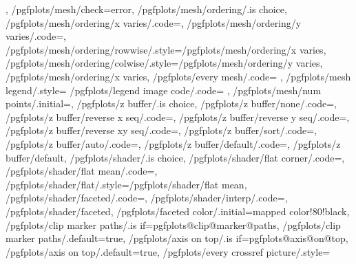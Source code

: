 {{{{{				}%
			}%
		}%
	},%
	/pgfplots/mesh/check=error,
	/pgfplots/mesh/ordering/.is choice,
	/pgfplots/mesh/ordering/x varies/.code={\def\pgfplots@plot@mesh@ordering{0}},
	/pgfplots/mesh/ordering/y varies/.code={\def\pgfplots@plot@mesh@ordering{1}},
	/pgfplots/mesh/ordering/rowwise/.style={/pgfplots/mesh/ordering/x varies},
	/pgfplots/mesh/ordering/colwise/.style={/pgfplots/mesh/ordering/y varies},
	/pgfplots/mesh/ordering/x varies,
	/pgfplots/every mesh/.code={%
	},%
	/pgfplots/mesh legend/.style={%
		/pgfplots/legend image code/.code={%
		}%
	},
	/pgfplots/mesh/num points/.initial=\numcoords,%
	/pgfplots/z buffer/.is choice,%
	/pgfplots/z buffer/none/.code={\def\pgfplotsplothandlermesh@zbuffer@choice{0}},%
	/pgfplots/z buffer/reverse x seq/.code={\def\pgfplotsplothandlermesh@zbuffer@choice{1}},%
	/pgfplots/z buffer/reverse y seq/.code={\def\pgfplotsplothandlermesh@zbuffer@choice{2}},%
	/pgfplots/z buffer/reverse xy seq/.code={\def\pgfplotsplothandlermesh@zbuffer@choice{3}},%
	/pgfplots/z buffer/sort/.code={\def\pgfplotsplothandlermesh@zbuffer@choice{4}},%
	/pgfplots/z buffer/auto/.code={\def\pgfplotsplothandlermesh@zbuffer@choice{5}},%
	/pgfplots/z buffer/default/.code={\def\pgfplotsplothandlermesh@zbuffer@choice{6}},%
	/pgfplots/z buffer/default,%
	/pgfplots/shader/.is choice,
	/pgfplots/shader/flat corner/.code={\def\pgfplotsplothandlermesh@shader{0}\def\pgfplotsplothandlermesh@flatmode{c}},
	/pgfplots/shader/flat mean/.code={\def\pgfplotsplothandlermesh@shader{0}\def\pgfplotsplothandlermesh@flatmode{m}},
	/pgfplots/shader/flat/.style={/pgfplots/shader/flat mean},%
	/pgfplots/shader/faceted/.code={\def\pgfplotsplothandlermesh@shader{1}},
	/pgfplots/shader/interp/.code={\def\pgfplotsplothandlermesh@shader{2}},
	/pgfplots/shader/faceted,
	/pgfplots/faceted color/.initial=mapped color!80!black,
	/pgfplots/clip marker paths/.is if=pgfplots@clip@marker@paths,
	/pgfplots/clip marker paths/.default=true,
	/pgfplots/axis on top/.is if=pgfplots@axis@on@top,
	/pgfplots/axis on top/.default=true,
	/pgfplots/every crossref picture/.style={%
}}

